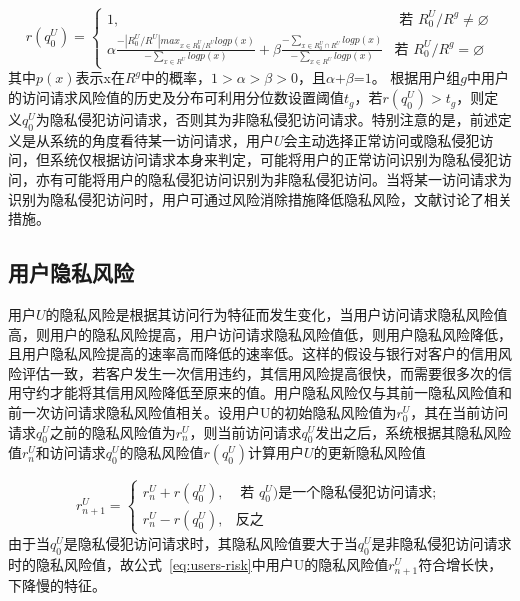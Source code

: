 \begin{equation}
r(q_{0}^{U})=\begin{cases}
1, & \text{ 若 } R_{0}^{U}/{{R}^{g}}\ne \varnothing \\ 
\alpha \frac{-|R_{0}^{U}/{R}^{U}|max_{x\in R_{0}^{U}/{R}^{U}}logp(x)}{-\sum_{x\in{R^U}}logp(x)}+ \beta \frac{-\sum_{x\in R_0^U \cap  R^U}logp(x)}{-\sum_{x\in  R^U}logp(x)}& \text{若 } R_{0}^{U}/{{R}^{g}}=\varnothing 
\end{cases}
\end{equation}
其中$p(x)$表示x在$R_{{}}^{g}$中的概率，$1>\alpha >\beta >0$，且$\alpha \text{+}\beta \text{=}1$。
根据用户组$g$中用户的访问请求风险值的历史及分布可利用分位数设置阈值${{t}_{g}}$，若$r(q_{0}^{U})>{{t}_{g}}$，则定义$q_{0}^{U}$为隐私侵犯访问请求，否则其为非隐私侵犯访问请求。特别注意的是，前述定义是从系统的角度看待某一访问请求，用户$U$会主动选择正常访问或隐私侵犯访问，但系统仅根据访问请求本身来判定，可能将用户的正常访问识别为隐私侵犯访问，亦有可能将用户的隐私侵犯访问识别为非隐私侵犯访问。当将某一访问请求为识别为隐私侵犯访问时，用户可通过风险消除措施降低隐私风险，文献\cite{diaz-lopez2016dynamic}讨论了相关措施。

\subsection{用户隐私风险}
用户$U$的隐私风险是根据其访问行为特征而发生变化，当用户访问请求隐私风险值高，则用户的隐私风险提高，用户访问请求隐私风险值低，则用户隐私风险降低，且用户隐私风险提高的速率高而降低的速率低。这样的假设与银行对客户的信用风险评估一致，若客户发生一次信用违约，其信用风险提高很快，而需要很多次的信用守约才能将其信用风险降低至原来的值。用户隐私风险仅与其前一隐私风险值和前一次访问请求隐私风险值相关。设用户U的初始隐私风险值为$r_{0}^{U}$，其在当前访问请求$q_{0}^{U}$之前的隐私风险值为$r_{n}^{U}$，则当前访问请求$q_{0}^{U}$发出之后，系统根据其隐私风险值$r_{n}^{U}$和访问请求$q_{0}^{U}$的隐私风险值$r(q_{0}^{U})$计算用户$U$的更新隐私风险值

\begin{equation}\label{eq:users-risk}
r_{n+1}^{U}=\begin{cases}
r_{n}^{U}+r(q_0^U), & \text{ 若 } q_0^U) \text{是一个隐私侵犯访问请求}; \\ 
r_{n}^{U}-r(q_0^U),& \text{反之}
\end{cases}
\end{equation} 
由于当$q_{0}^{U}$是隐私侵犯访问请求时，其隐私风险值要大于当$q_{0}^{U}$是非隐私侵犯访问请求时的隐私风险值，故公式~\ref{eq:users-risk}中用户U的隐私风险值$r_{n+1}^{U}$符合增长快，下降慢的特征。


